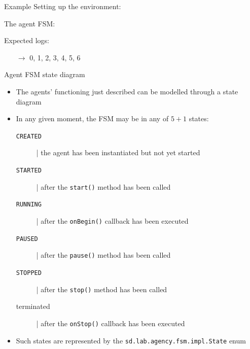 \documentclass[presentation]{beamer}\mode<presentation>{\usetheme{AMSCesenaPurpleAndGold}}
\begin{document}
\begin{frame}[allowframebreaks]{Example}
    Setting up the environment:
    
    
    \framebreak
    
    The agent FSM:
    
    
    Expected logs:
    \begin{itemize}
    	\item[$\rightarrow$] 0, 1, 2, 3, 4, 5, 6
    \end{itemize}
\end{frame}

\begin{frame}[allowframebreaks]{Agent FSM state diagram}

    \begin{itemize}
        \item The agents' functioning just described can be modelled through a state diagram
        
        \bigskip
        
        \item In any given moment, the FSM may be in any of $5+1$ states:
        \begin{description}
            \item[\texttt{CREATED}] | the agent has been instantiated but not yet started
            
            \item[\texttt{STARTED}] | after the \texttt{start()} method has been called
            
            \item[\texttt{RUNNING}] | after the \texttt{onBegin()} callback has been executed
            
            \item[\texttt{PAUSED}] | after the \texttt{pause()} method has been called
            
            \item[\texttt{STOPPED}] | after the \texttt{stop()} method has been called
            
            \item[terminated] | after the \texttt{onStop()} callback has been executed
        \end{description}
    
    	\bigskip
    	
    	\item Such states are represented by the \texttt{sd.lab.agency.fsm.impl.\alert{State}} enum
        

\end{itemize}
\end{frame}
\end{document}
